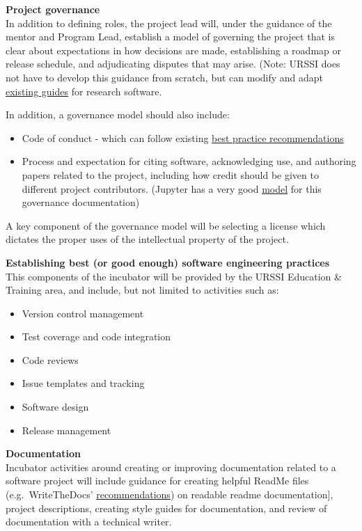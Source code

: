 \documentclass[
]{book}
\providecommand{\tightlist}{%
  \setlength{\itemsep}{0pt}\setlength{\parskip}{0pt}}
\begin{document}
\textbf{Project governance}\\
In addition to defining roles, the project lead will, under the guidance of the mentor and Program Lead, establish a model of governing the project that is clear about expectations in how decisions are made, establishing a roadmap or release schedule, and adjudicating disputes that may arise.
(Note: URSSI does not have to develop this guidance from scratch, but can modify and adapt \href{https://opensource.guide/leadership-and-governance/}{existing guides} for research software.

In addition, a governance model should also include:

\begin{itemize}
\tightlist
\item
  Code of conduct - which can follow existing \href{https://opensource.guide/code-of-conduct/\%20as\%20a\%20guide}{best practice recommendations}
\item
  Process and expectation for citing software, acknowledging use, and authoring papers related to the project, including how credit should be given to different project contributors. (Jupyter has a very good \href{https://github.com/jupyter/governance/blob/master/papers.md}{model} for this governance documentation)
\end{itemize}

A key component of the governance model will be selecting a license which dictates the proper uses of the intellectual property of the project.

\textbf{Establishing best (or good enough) software engineering practices}\\
This components of the incubator will be provided by the URSSI Education \& Training area, and include, but not limited to activities such as:

\begin{itemize}
\tightlist
\item
  Version control management
\item
  Test coverage and code integration
\item
  Code reviews
\item
  Issue templates and tracking
\item
  Software design
\item
  Release management
\end{itemize}

\textbf{Documentation}\\
Incubator activities around creating or improving documentation related to a software project will include guidance for creating helpful ReadMe files (e.g.~WriteTheDocs' \href{https://www.writethedocs.org/videos/na/2016/write-the-readable-readme-daniel-beck/}{recommendations}) on readable readme documentation{]}, project descriptions, creating style guides for documentation, and review of documentation with a technical writer.
\end{document}
